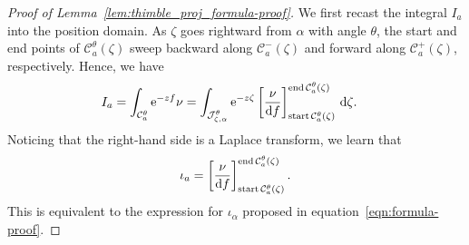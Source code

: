 \documentclass[pdftex]{sigma}
\numberwithin{equation}{section}
\begin{document}
\begin{proof}[Proof of Lemma~\ref{lem:thimble_proj_formula-proof}]
We first recast the integral $I_a$ into the position domain. As $\zeta$ goes rightward from $\alpha$ with angle $\theta$, the start and end points of $\mathcal{C}_a^\theta(\zeta)$ sweep backward along $\mathcal{C}^-_a(\zeta)$ and forward along $\mathcal{C}^+_a(\zeta)$, respectively. Hence, we have
\begin{align*}
I_a & = \int_{\mathcal{C}_a^\theta} {\rm e}^{-zf} \nu= \int_{\mathcal{J}_{\zeta,\alpha}^\theta}{\rm e}^{-z\zeta} \left[\frac{\nu}{{\rm d}f}\right]_{\operatorname{start} \mathcal{C}_a^\theta(\zeta)}^{\operatorname{end} \mathcal{C}_a^\theta(\zeta)} \,{\rm d}\zeta.
\end{align*}
Noticing that the right-hand side is a Laplace transform, we learn that
\begin{equation}\label{thimble-difference}
{\iota}_a = \left[\frac{\nu}{ {\rm d}f}\right]_{\operatorname{start} \mathcal{C}_a^\theta(\zeta)}^{\operatorname{end} \mathcal{C}_a^\theta(\zeta)}.
\end{equation}
This is equivalent to the expression for $\iota_\alpha$ proposed in equation~\eqref{eqn:formula-proof}.
\end{proof}
\end{document}
